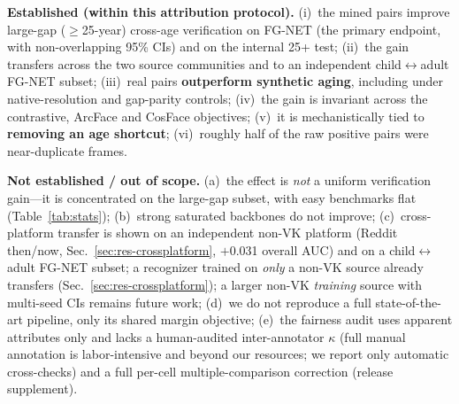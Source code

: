 \documentclass[journal]{IEEEtran}
\begin{document}
\noindent\textbf{Established (within this attribution protocol).} (i)~the mined pairs improve large-gap ($\geq$25-year) cross-age verification on FG-NET (the primary endpoint, with non-overlapping 95\% CIs) and on the internal 25+ test; (ii)~the gain transfers across the two source communities and to an independent child$\leftrightarrow$adult FG-NET subset; (iii)~real pairs \textbf{outperform synthetic aging}, including under native-resolution and gap-parity controls; (iv)~the gain is invariant across the contrastive, ArcFace and CosFace objectives; (v)~it is mechanistically tied to \textbf{removing an age shortcut}; (vi)~roughly half of the raw positive pairs were near-duplicate frames.

\noindent\textbf{Not established / out of scope.} (a)~the effect is \emph{not} a uniform verification gain---it is concentrated on the large-gap subset, with easy benchmarks flat (Table~\ref{tab:stats}); (b)~strong saturated backbones do not improve; (c)~cross-platform transfer is shown on an independent non-VK platform (Reddit then/now, Sec.~\ref{sec:res-crossplatform}, $+$0.031 overall AUC) and on a child$\leftrightarrow$adult FG-NET subset; a recognizer trained on \emph{only} a non-VK source already transfers (Sec.~\ref{sec:res-crossplatform}); a larger non-VK \emph{training} source with multi-seed CIs remains future work; (d)~we do not reproduce a full state-of-the-art pipeline, only its shared margin objective; (e)~the fairness audit uses apparent attributes only and lacks a human-audited inter-annotator $\kappa$ (full manual annotation is labor-intensive and beyond our resources; we report only automatic cross-checks) and a full per-cell multiple-comparison correction (release supplement).
\end{document}
